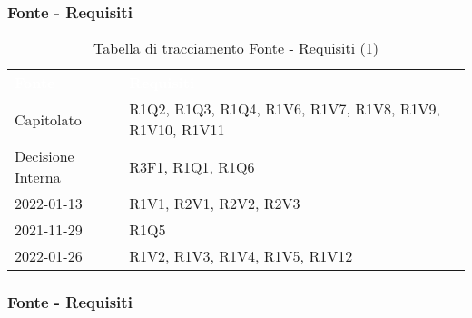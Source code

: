 
\subsubsection{Fonte - Requisiti}


\begin{table}[H]
\renewcommand{\arraystretch}{1.5}
\begin{tabular}{ m{}<{\centering}  m{}<{\centering} }
	\rowcolor{darkblue}
	\textcolor{white}{\textbf{Fonte}} &\textcolor{white}{\textbf{Requisiti}}\\ 

	Capitolato & R1Q2, R1Q3, R1Q4, R1V6, R1V7, R1V8, R1V9, R1V10, R1V11\\	

	Decisione Interna & R3F1, R1Q1, R1Q6 \\
	
	\Vi{} 2022-01-13 & R1V1, R2V1, R2V2, R2V3 \\
	
	\Vi{} 2021-11-29 & R1Q5 \\
	
	\Ve{} 2022-01-26 & R1V2, R1V3, R1V4, R1V5, R1V12 \\

\end{tabular}
\caption{Tabella di tracciamento Fonte - Requisiti (1)}
\end{table}

\subsubsection{Fonte - Requisiti}

